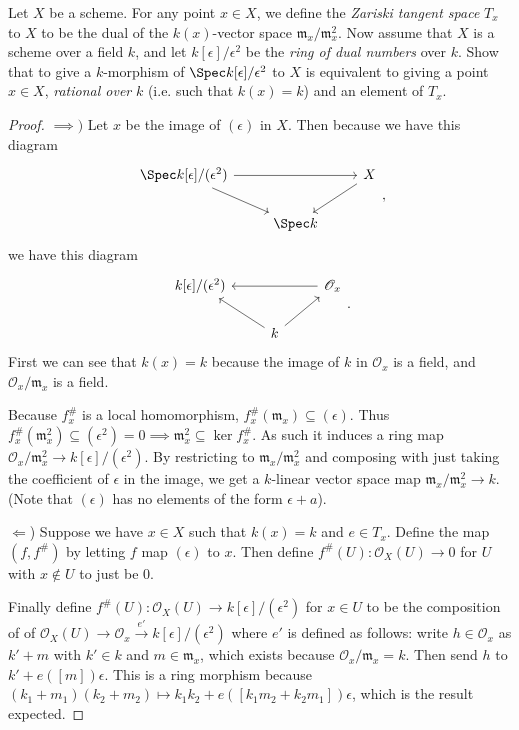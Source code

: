 \begin{exercise}%
	Let $X$	be a scheme. For any point $x\in X $, we define the \textit{Zariski tangent space} $T_x $ to $X $ to be the dual of the $k(x) $-vector space $\mathfrak{m}_x / \mathfrak{m}_x^2 $. Now assume that $X $ is a scheme over a field $k $, and let $k[\epsilon] / \epsilon^2$ be the \textit{ring of dual numbers} over $k $. Show that to give a $k $-morphism of $\Spec k[\epsilon] / \epsilon^2 $ to $X $ is equivalent to giving a point $x\in X $, \textit{rational over} $k $ (i.e. such that $k(x) = k $) and an element of $T_x $.
\end{exercise}
\begin{proof}
	$\implies) $
	Let $x $ be the image of $(\epsilon) $ in $X $.
	Then because we have this diagram
	\[
	\begin{tikzcd}
		\Spec k[\epsilon]/(\epsilon^2) & & X\\
	 & \Spec k &
	\arrow[from=1-1,to=1-3]
	\arrow[from=1-1,to=2-2]
	\arrow[from=1-3,to=2-2]
	\end{tikzcd},
	\]
	we have this diagram
	\[
	\begin{tikzcd}
		k[\epsilon] / (\epsilon^2) & & \mathscr{O}_x\\
	 & k &
	\arrow[from=1-3,to=1-1]
	\arrow[from=2-2,to=1-1]
	\arrow[from=2-2,to=1-3]
	\end{tikzcd}.
	\]
	First we can see that $k(x) = k $ because the image of $k $ in $\mathscr{O}_x $ is a field, and $\mathscr{O}_x / \mathfrak{m}_x $ is a field.

	Because $f^\#_x $ is a local homomorphism, $f^\#_x(\mathfrak{m}_x) \subseteq (\epsilon) $.
	Thus $f^\#_x(\mathfrak{m}_x^2) \subseteq (\epsilon^2) = 0 \implies \mathfrak{m}_x^2 \subseteq \ker f^\#_x $.
	As such it induces a ring map $\mathscr{O}_x / \mathfrak{m}^2_x \to k[\epsilon] / (\epsilon^2)$.
	By restricting to $\mathfrak{m}_x / \mathfrak{m}_x^2 $ and composing with just taking the coefficient of $\epsilon $ in the image, we get a $k $-linear vector space map $\mathfrak{m}_x / \mathfrak{m}_x^2 \to k $.
	(Note that $(\epsilon) $ has no elements of the form $\epsilon+a $).

	$\Leftarrow $) Suppose we have $x \in X $ such that $k(x) = k $ and $e \in T_x $. 
	Define the map $(f,f^\#) $ by letting $f $ map $(\epsilon) $ to $x $.
	Then define $f^\#(U): \mathscr{O}_X(U) \to 0$ for $U$ with $x\notin U $ to just be 0.

	Finally define $f^\#(U): \mathscr{O}_X(U) \to k[\epsilon] / (\epsilon^2) $ for $x\in U $ to be the composition of of $\mathscr{O}_X(U) \to \mathscr{O}_x \xrightarrow{e'} k[\epsilon] / (\epsilon^2)$ where $e' $ is defined as follows:
	write $h \in \mathscr{O}_x $ as $k' + m $ with $k' \in k $ and $m \in \mathfrak{m}_x $, which exists because $\mathscr{O}_x / \mathfrak{m}_x = k $.
	Then send $h $ to $k' + e([m])\epsilon$.
	This is a ring morphism because $(k_{1}+m_{1})(k_{2}+m_{2}) \mapsto k_{1}k_{2} + e([k_{1}m_{2}+k_{2}m_{1}])\epsilon $, which is the result expected.
\end{proof}

